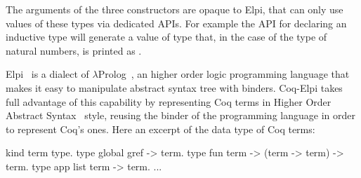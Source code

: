 \documentclass[a4paper,UKenglish,cleveref, autoref]{lipics-v2019}
\theoremstyle{implem}
\theoremstyle{implem}
\theoremstyle{axiom}
\theoremstyle{abscommand}
\theoremstyle{command}
\begin{document}
The arguments of the three constructors are opaque to Elpi, that can only use
values of these types via dedicated APIs. For example the API for declaring
an inductive type will generate a value of type  that,
in the case of the type of natural numbers, is printed as .

Elpi~\cite{DBLP:conf/lpar/DunchevGCT15} is a dialect
of $\lambda$Prolog~\cite{Miller:2012:PHL:2331097}, an higher order
logic programming language that makes it easy to manipulate abstract syntax
tree with binders. Coq-Elpi takes full advantage of this capability by
representing Coq terms in Higher Order Abstract
Syntax~\cite{10.1145/53990.54010} style, reusing the binder of the programming
language in order to represent Coq's ones. Here an excerpt of the data
type of Coq terms:

\begin{elpicode}
kind term type.                              %
type global gref -> term.                    %
type fun    term -> (term -> term) -> term.  %
type app    list term -> term.               %
... %
\end{elpicode}
\end{document}
